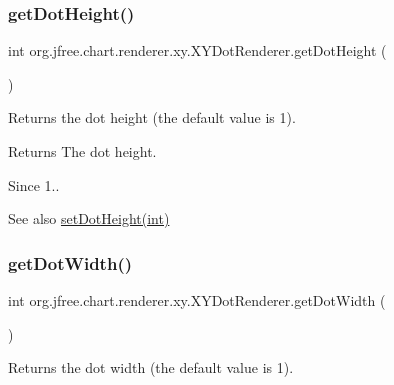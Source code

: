 \subsubsection{\texorpdfstring{get\+Dot\+Height()}{getDotHeight()}}
{\footnotesize\ttfamily int org.\+jfree.\+chart.\+renderer.\+xy.\+X\+Y\+Dot\+Renderer.\+get\+Dot\+Height (\begin{DoxyParamCaption}{ }\end{DoxyParamCaption})}

Returns the dot height (the default value is 1).

\begin{DoxyReturn}{Returns}
The dot height.
\end{DoxyReturn}
\begin{DoxySince}{Since}
1.. 
\end{DoxySince}
\begin{DoxySeeAlso}{See also}
\mbox{\hyperlink{classorg_1_1jfree_1_1chart_1_1renderer_1_1xy_1_1_x_y_dot_renderer_a6467c5313ad8b1275bb4e6a341b85e90}{set\+Dot\+Height(int)}} 
\end{DoxySeeAlso}
\mbox{\label{classorg_1_1jfree_1_1chart_1_1renderer_1_1xy_1_1_x_y_dot_renderer_a957cd27a2e53b0caf7675f6abe030df5}} 
\subsubsection{\texorpdfstring{get\+Dot\+Width()}{getDotWidth()}}
{\footnotesize\ttfamily int org.\+jfree.\+chart.\+renderer.\+xy.\+X\+Y\+Dot\+Renderer.\+get\+Dot\+Width (\begin{DoxyParamCaption}{ }\end{DoxyParamCaption})}

Returns the dot width (the default value is 1).

